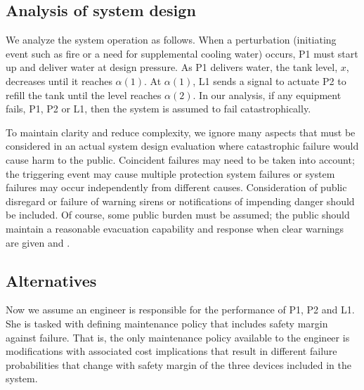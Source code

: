 \documentclass[review]{elsarticle}
\begin{document}
	
%

\subsection{Analysis of system design}\label{sec:analysis}
	We analyze the system operation as follows.
	When a perturbation (initiating event such as fire or a need for supplemental cooling water) occurs, 
	P1 must start up and deliver water at design pressure.
	As P1 delivers water, the tank level, $x$, decreases until it reaches $\alpha(1)$.
	At $\alpha(1)$, L1 sends a signal to actuate P2 to refill the tank until the level reaches
	$\alpha(2)$.
	In our analysis, if any equipment fails, P1, P2 or L1, then the system is assumed to fail 
	catastrophically.
	
	To maintain clarity and reduce complexity, we ignore many aspects that must 
	be considered in an actual system design evaluation where catastrophic failure would cause harm 
	to the public.
	Coincident failures may need to be taken into account; the triggering event may cause multiple 
	protection system failures or system failures may occur independently from different causes.
	Consideration of public disregard or failure of warning sirens or notifications of impending danger 
	should be included.
	Of course, some public burden must be assumed; the public should maintain a reasonable evacuation 
	capability and response when clear warnings are given \citep[for example][in nuclear accidents]{edselc.2-52.0-002243974919860101} and \citep[for example][in a consequential response to volcano warnings]{469228419860302,2W6257764379020150518}.
	
	
\subsection{Alternatives}\label{sec:alternatives}
	Now we assume an engineer is responsible for the performance of P1, P2 and L1.
	She is tasked with defining maintenance policy that includes safety margin against failure.
	That is, the only maintenance policy available to the engineer is modifications with associated cost 
	implications that result in different failure probabilities that change with safety margin of the three 
	devices included in the system.
	
\end{document}
